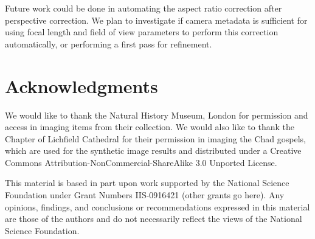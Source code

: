 \documentclass[a4paper]{llncs}
\begin{document}
Future work could be done in automating the aspect ratio correction after perspective correction. We plan to
investigate if camera metadata is sufficient for using focal length and field of view parameters to perform this
correction automatically, or performing a first pass for refinement.

\section{Acknowledgments}

We would like to thank the Natural History Museum, London for permission and access in imaging items from their collection. We would also like to thank the Chapter of Lichfield Cathedral for their permission in imaging the Chad gospels,
which are used for the synthetic image results and distributed under a Creative Commons Attribution-NonCommercial-ShareAlike 3.0 Unported License.

This material is based in part upon work supported by the National Science Foundation under Grant Numbers
IIS-0916421 (other grants go here).
Any opinions, findings, and conclusions or recommendations expressed in this material are those of the authors
and do not necessarily reflect the views of the National Science Foundation.



\end{document}
